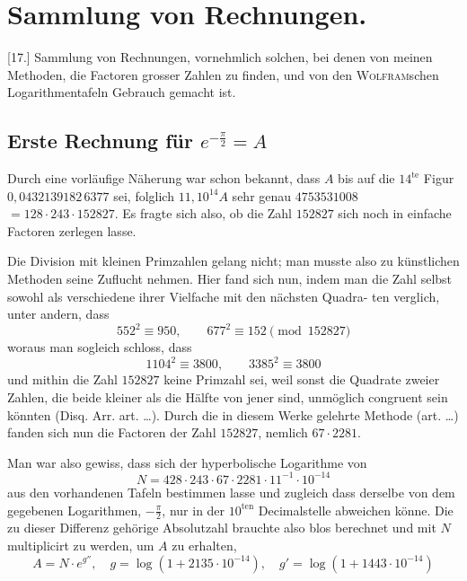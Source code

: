 \documentclass[10pt,a4paper]{article}
\begin{document}
\section*{Sammlung von Rechnungen.}

[17.] Sammlung von Rechnungen, vornehmlich solchen, bei denen von meinen Methoden, die Factoren grosser Zahlen zu finden, und von den \textsc{Wolfram}schen Logarithmentafeln Gebrauch gemacht ist.

\subsection*{Erste Rechnung für \texorpdfstring{$e^{-\frac{\pi}{2}}=A$}{e\^{}(-pi/2)=A}}

Durch eine vorläufige Näherung war schon bekannt, dass $A$ bis auf die
$14^{\text{te}}$ Figur $0{,}0432139182\,6377$ sei, folglich $11{,}10^{14}A$ sehr genau $4753531008$
$=128\cdot243\cdot152827$. Es fragte sich also, ob die Zahl $152827$ sich noch in einfache Factoren zerlegen lasse.

Die Division mit kleinen Primzahlen gelang nicht; man musste also zu
künstlichen Methoden seine Zuflucht nehmen. Hier fand sich nun, indem man
die Zahl selbst sowohl als verschiedene ihrer Vielfache mit den nächsten Quadra-
ten verglich, unter andern, dass
\[
552^2 \equiv 950, \qquad 677^2 \equiv 152 \pmod{152827}
\]
woraus man sogleich schloss, dass
\[
1104^2 \equiv 3800, \qquad 3385^2 \equiv 3800
\]
und mithin die Zahl $152827$ keine Primzahl sei, weil sonst die Quadrate zweier
Zahlen, die beide kleiner als die Hälfte von jener sind, unmöglich congruent
sein könnten (Disq. Arr. art. \ldots). Durch die in diesem Werke gelehrte Methode (art. \ldots) fanden sich nun die Factoren der Zahl $152827$, nemlich $67\cdot2281$.

Man war also gewiss, dass sich der hyperbolische Logarithme von
\[
N = 428\cdot243\cdot67\cdot2281\cdot11^{-1}\cdot10^{-14}
\]
aus den vorhandenen Tafeln bestimmen lasse und zugleich dass derselbe von dem
gegebenen Logarithmen, $-\frac{\pi}{2}$, nur in der $10^{\text{ten}}$ Decimalstelle abweichen könne.
Die zu dieser Differenz gehörige Absolutzahl brauchte also blos berechnet und
mit $N$ multiplicirt zu werden, um $A$ zu erhalten,
\[
A = N\cdot e^{g''}, \quad g = \log(1+2135\cdot10^{-14}), \quad g' = \log(1+1443\cdot10^{-14})
\]
\end{document}
